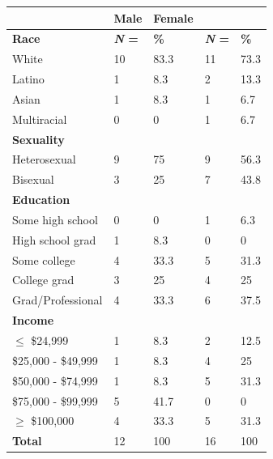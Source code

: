 \documentclass[twoside]{report}
\begin{document}
\begin{longtable}[]{@{}lllll@{}}
 \toprule
                     & \textbf{Male}              & \textbf{Female} &                     & \tabularnewline
 \midrule
 \endhead
 \textbf{Race}       & \textbf{\emph{N} =}        & \textbf{\%}     & \textbf{\emph{N} =}
                     & \textbf{\%}\tabularnewline
 White               & 10                         & 83.3            & 11                  & 73.3\tabularnewline
 Latino              & 1                          & 8.3             & 2                   & 13.3\tabularnewline
 Asian               & 1                          & 8.3             & 1                   & 6.7\tabularnewline
 Multiracial         & 0                          & 0               & 1                   & 6.7\tabularnewline
 \textbf{Sexuality}  &                            &                 &                     & \tabularnewline
 Heterosexual        & 9                          & 75              & 9                   & 56.3\tabularnewline
 Bisexual            & 3                          & 25              & 7                   & 43.8\tabularnewline
 \textbf{Education}  &                            &                 &                     & \tabularnewline
 Some high school    & 0                          & 0               & 1                   & 6.3\tabularnewline
 High school grad    & 1                          & 8.3             & 0                   & 0\tabularnewline
 Some college        & 4                          & 33.3            & 5                   & 31.3\tabularnewline
 College grad        & 3                          & 25              & 4                   & 25\tabularnewline
 Grad/Professional   & 4                          & 33.3            & 6                   & 37.5\tabularnewline
 \textbf{Income}     &                            &                 &                     & \tabularnewline
 $\leq$ \$24,999     & 1                          & 8.3             & 2                   & 12.5\tabularnewline
 \$25,000 - \$49,999 & 1                          & 8.3             & 4                   & 25\tabularnewline
 \$50,000 - \$74,999 & 1                          & 8.3             & 5                   & 31.3\tabularnewline
 \$75,000 - \$99,999 & 5                          & 41.7            & 0                   & 0\tabularnewline
 $\geq$ \$100,000    & 4                          & 33.3            & 5                   & 31.3\tabularnewline
 \textbf{Total}      & 12                         & 100             & 16                  & 100\tabularnewline
 \bottomrule
\end{longtable}
\end{document}
